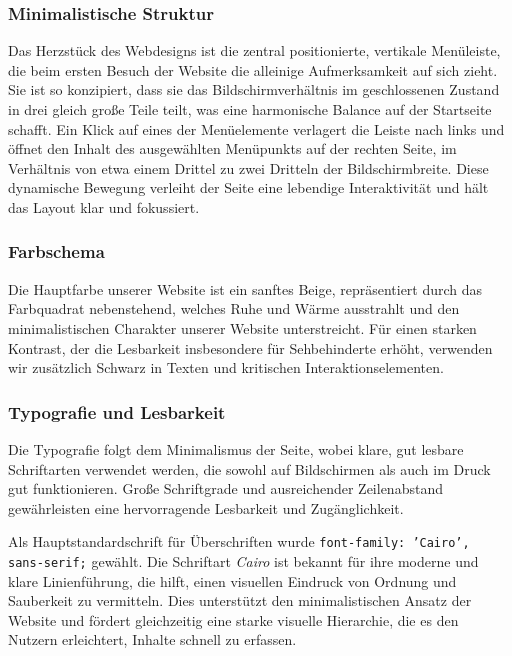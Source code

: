 \subsubsection{Minimalistische Struktur}
Das Herzstück des Webdesigns ist die zentral positionierte, vertikale Menüleiste, die beim ersten Besuch der Website die alleinige Aufmerksamkeit auf sich zieht. Sie ist so konzipiert, dass sie das Bildschirmverhältnis im geschlossenen Zustand in drei gleich große Teile teilt, was eine harmonische Balance auf der Startseite schafft. Ein Klick auf eines der Menüelemente verlagert die Leiste nach links und öffnet den Inhalt des ausgewählten Menüpunkts auf der rechten Seite, im Verhältnis von etwa einem Drittel zu zwei Dritteln der Bildschirmbreite. Diese dynamische Bewegung verleiht der Seite eine lebendige Interaktivität und hält das Layout klar und fokussiert.

\subsubsection{Farbschema}
Die Hauptfarbe unserer Website ist ein sanftes Beige, repräsentiert durch das Farbquadrat nebenstehend, welches Ruhe und Wärme ausstrahlt und den minimalistischen Charakter unserer Website unterstreicht. Für einen starken Kontrast, der die Lesbarkeit insbesondere für Sehbehinderte erhöht, verwenden wir zusätzlich Schwarz in Texten und kritischen Interaktionselementen.

\noindent{} \quad {}

\subsubsection{Typografie und Lesbarkeit}
Die Typografie folgt dem Minimalismus der Seite, wobei klare, gut lesbare Schriftarten verwendet werden, die sowohl auf Bildschirmen als auch im Druck gut funktionieren. Große Schriftgrade und ausreichender Zeilenabstand gewährleisten eine hervorragende Lesbarkeit und Zugänglichkeit.

Als Hauptstandardschrift für Überschriften wurde \texttt{font-family: 'Cairo', sans-serif;} gewählt. Die Schriftart \textit{Cairo} ist bekannt für ihre moderne und klare Linienführung, die hilft, einen visuellen Eindruck von Ordnung und Sauberkeit zu vermitteln. Dies unterstützt den minimalistischen Ansatz der Website und fördert gleichzeitig eine starke visuelle Hierarchie, die es den Nutzern erleichtert, Inhalte schnell zu erfassen.

